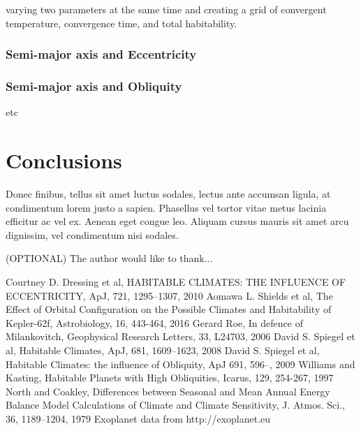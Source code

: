 \documentclass[12pt, onecolumn]{revtex4-2}    %
\begin{document}
varying two parameters at the same time and creating a grid of convergent temperature, convergence time, and total habitability.

\subsubsection*{Semi-major axis and Eccentricity}

\subsubsection*{Semi-major axis and Obliquity}

etc

\section{Conclusions} \label{sec:conclusion}

Donec finibus, tellus sit amet luctus sodales, lectus ante accumsan ligula, at condimentum lorem justo a sapien. Phasellus vel tortor vitae metus lacinia efficitur ac vel ex. Aenean eget congue leo. Aliquam cursus mauris sit amet arcu dignissim, vel condimentum nisi sodales.

\begin{acknowledgments}
    (OPTIONAL) The author would like to thank...
\end{acknowledgments}

\begin{thebibliography}{}
     Courtney D. Dressing et al, HABITABLE CLIMATES: THE INFLUENCE OF ECCENTRICITY, ApJ, 721, 1295--1307, 2010
     Aomawa L. Shields et al, The Effect of Orbital Configuration on the Possible Climates and Habitability of Kepler-62f, Astrobiology, 16, 443-464, 2016
     Gerard Roe, In defence of Milankovitch, Geophysical Research Letters, 33, L24703, 2006
     David S. Spiegel et al, Habitable Climates, ApJ, 681, 1609--1623, 2008
     David S. Spiegel et al, Habitable Climates: the influence of Obliquity, ApJ 691, 596--, 2009
     Williams and Kasting, Habitable Planets with High Obliquities, Icarus, 129, 254-267, 1997
     North and Coakley, Differences between Seasonal and Mean Annual Energy Balance Model Calculations of Climate and Climate Sensitivity, J. Atmos. Sci., 36, 1189--1204, 1979
     Exoplanet data from http://exoplanet.eu
\end{thebibliography}
\end{document}
